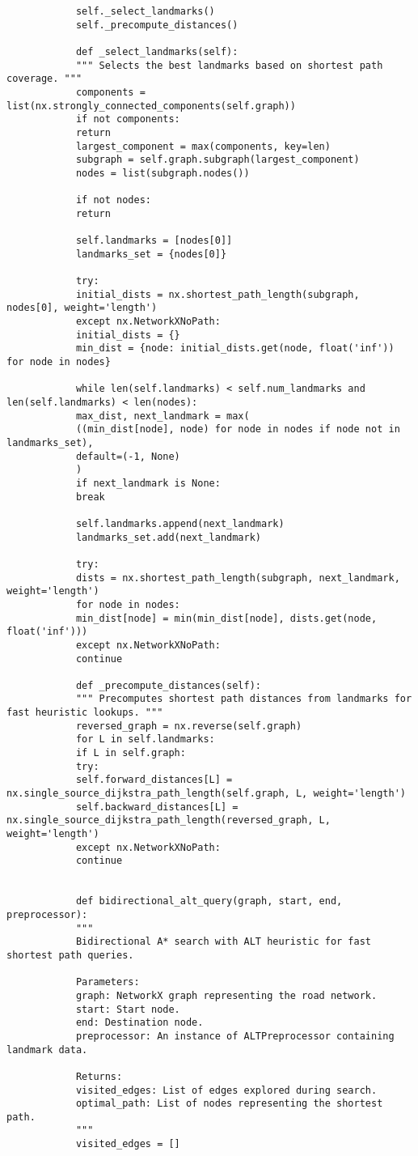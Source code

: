 \begin{appendices}
\begin{lstlisting}
			self._select_landmarks()
			self._precompute_distances()
			
			def _select_landmarks(self):
			""" Selects the best landmarks based on shortest path coverage. """
			components = list(nx.strongly_connected_components(self.graph))
			if not components:
			return
			largest_component = max(components, key=len)
			subgraph = self.graph.subgraph(largest_component)
			nodes = list(subgraph.nodes())
			
			if not nodes:
			return
			
			self.landmarks = [nodes[0]]
			landmarks_set = {nodes[0]}
			
			try:
			initial_dists = nx.shortest_path_length(subgraph, nodes[0], weight='length')
			except nx.NetworkXNoPath:
			initial_dists = {}
			min_dist = {node: initial_dists.get(node, float('inf')) for node in nodes}
			
			while len(self.landmarks) < self.num_landmarks and len(self.landmarks) < len(nodes):
			max_dist, next_landmark = max(
			((min_dist[node], node) for node in nodes if node not in landmarks_set),
			default=(-1, None)
			)
			if next_landmark is None:
			break
			
			self.landmarks.append(next_landmark)
			landmarks_set.add(next_landmark)
			
			try:
			dists = nx.shortest_path_length(subgraph, next_landmark, weight='length')
			for node in nodes:
			min_dist[node] = min(min_dist[node], dists.get(node, float('inf')))
			except nx.NetworkXNoPath:
			continue
			
			def _precompute_distances(self):
			""" Precomputes shortest path distances from landmarks for fast heuristic lookups. """
			reversed_graph = nx.reverse(self.graph)
			for L in self.landmarks:
			if L in self.graph:
			try:
			self.forward_distances[L] = nx.single_source_dijkstra_path_length(self.graph, L, weight='length')
			self.backward_distances[L] = nx.single_source_dijkstra_path_length(reversed_graph, L, weight='length')
			except nx.NetworkXNoPath:
			continue
			
			
			def bidirectional_alt_query(graph, start, end, preprocessor):
			"""
			Bidirectional A* search with ALT heuristic for fast shortest path queries.
			
			Parameters:
			graph: NetworkX graph representing the road network.
			start: Start node.
			end: Destination node.
			preprocessor: An instance of ALTPreprocessor containing landmark data.
			
			Returns:
			visited_edges: List of edges explored during search.
			optimal_path: List of nodes representing the shortest path.
			"""
			visited_edges = []
			

\end{lstlisting}
\end{appendices}
